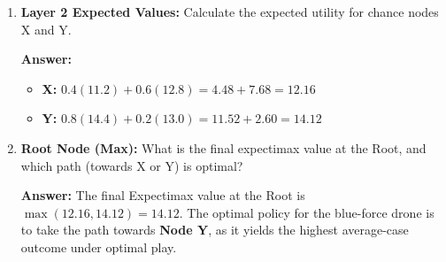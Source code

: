 \documentclass[11pt, letterpaper]{article}
\begin{document}
\begin{enumerate}[resume]
    \item \textbf{Layer 2 Expected Values:} Calculate the expected utility for chance nodes X and Y.\\
    \begin{tcolorbox}[colback=gray!10, colframe=gray!50, title=Solution]
    \textbf{Answer:} 
    \begin{itemize}
        \item \textbf{X:} $0.4(11.2) + 0.6(12.8) = 4.48 + 7.68 = \mathbf{12.16}$
        \item \textbf{Y:} $0.8(14.4) + 0.2(13.0) = 11.52 + 2.60 = \mathbf{14.12}$
    \end{itemize}
    \end{tcolorbox}

    \item \textbf{Root Node (Max):} What is the final expectimax value at the Root, and which path (towards X or Y) is optimal?\\
    \begin{tcolorbox}[colback=gray!10, colframe=gray!50, title=Solution]
    \textbf{Answer:} The final Expectimax value at the Root is $\max(12.16, 14.12) = \mathbf{14.12}$. The optimal policy for the blue-force drone is to take the path towards \textbf{Node Y}, as it yields the highest average-case outcome under optimal play.
    \end{tcolorbox}
\end{enumerate}
\end{document}
